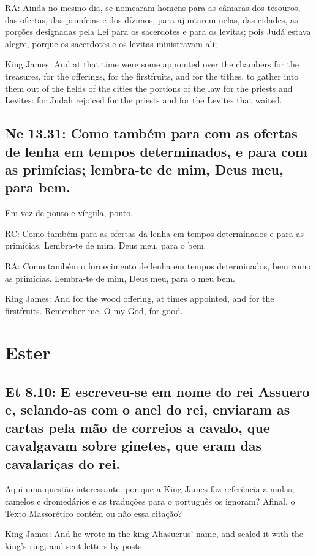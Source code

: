RA: Ainda no mesmo dia, se nomearam homens para as câmaras dos tesouros, das ofertas, das primícias e dos dízimos, para ajuntarem nelas, das cidades, as porções designadas pela Lei para os sacerdotes e para os levitas; pois Judá estava alegre, porque os sacerdotes e os levitas ministravam ali;

King James: And at that time were some appointed over the chambers for the treasures, for the offerings, for the firstfruits, and for the tithes, to gather into them out of the fields of the cities the portions of the law for the priests and Levites: for Judah rejoiced for the priests and for the Levites that waited.

\subsection{Ne 13.31: Como também para com as ofertas de lenha em tempos determinados, e para com as primícias\uline{;} lembra-te de mim, Deus meu, para bem.}
Em vez de ponto-e-vírgula, ponto.

RC: Como também para as ofertas da lenha em tempos determinados e para as primícias. Lembra-te de mim, Deus meu, para o bem.

RA: Como também o fornecimento de lenha em tempos determinados, bem como as primícias. Lembra-te de mim, Deus meu, para o meu bem.

King James: And for the wood offering, at times appointed, and for the firstfruits. Remember me, O my God, for good.

\section{Ester}
\subsection{Et 8.10: E escreveu-se em nome do rei Assuero e, selando-as com o anel do rei, enviaram as cartas pela mão de correios a cavalo, que cavalgavam sobre ginetes, que eram das cavalariças do rei.}

Aqui uma questão interessante: por que a King James faz referência a
mulas, camelos e dromedários e as traduções para o português os
ignoram? Afinal, o Texto Massorético contém ou não essa citação?

King James: And he wrote in the king Ahasuerus' name, and sealed it with the king's ring, and sent letters by posts 

